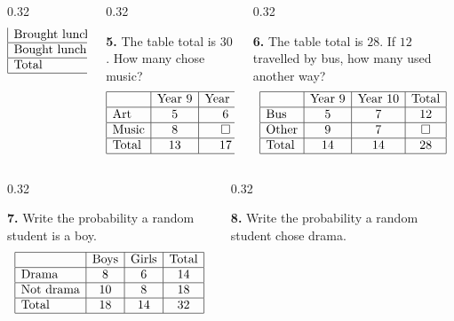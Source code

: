 \documentclass[aspectratio=169,12pt]{beamer}
\newcommand{\MMProblem}[2]{\begin{MMProblemCard}\raggedright\small\textbf{#1.} #2\par\end{MMProblemCard}}
\begin{document}
\begin{frame}[t]
\begin{columns}[T,onlytextwidth]
\begin{column}{0.32\textwidth}
{\[\begin{array}{|l|c|c|c|}
\text{Brought lunch} & 8 & 7 & 15 \\\hline
\text{Bought lunch} & 6 & \square & 15 \\\hline
\text{Total} & 14 & 16 & 30 \\\hline
\end{array}
\]}\end{column}
\begin{column}{0.32\textwidth}\MMProblem{5}{The table total is \mbox{$30$}. How many chose music?
\[
\begin{array}{|l|c|c|c|}
\hline
 & \text{Year 9} & \text{Year 10} & \text{Total} \\\hline
\text{Art} & 5 & 6 & 11 \\\hline
\text{Music} & 8 & \square & \square \\\hline
\text{Total} & 13 & 17 & 30 \\\hline
\end{array}
\]}\end{column}
\begin{column}{0.32\textwidth}\MMProblem{6}{The table total is \mbox{$28$}. If \mbox{$12$} travelled by bus, how many used another way?
\[
\begin{array}{|l|c|c|c|}
\hline
 & \text{Year 9} & \text{Year 10} & \text{Total} \\\hline
\text{Bus} & 5 & 7 & 12 \\\hline
\text{Other} & 9 & 7 & \square \\\hline
\text{Total} & 14 & 14 & 28 \\\hline
\end{array}
\]}\end{column}
\end{columns}
\vspace{0.45em}
\begin{columns}[T,onlytextwidth]
\begin{column}{0.32\textwidth}\MMProblem{7}{Write the probability a random student is a boy.
\[
\begin{array}{|l|c|c|c|}
\hline
 & \text{Boys} & \text{Girls} & \text{Total} \\\hline
\text{Drama} & 8 & 6 & 14 \\\hline
\text{Not drama} & 10 & 8 & 18 \\\hline
\text{Total} & 18 & 14 & 32 \\\hline
\end{array}
\]}\end{column}
\begin{column}{0.32\textwidth}\MMProblem{8}{Write the probability a random student chose drama.
}
\end{column}
\end{columns}
\end{frame}
\end{document}
